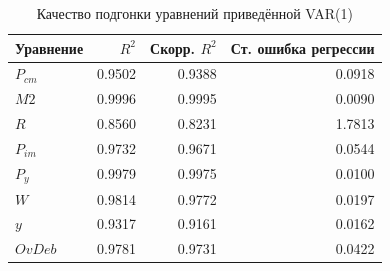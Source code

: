 \begin{table}[H]
\centering
\small

\begin{tabular}{l|r|r|r}
\hline
Уравнение & $R^2$ & Скорр. $R^2$ & Ст. ошибка регрессии\\
\hline
$P_{cm}$ & 0.9502 & 0.9388 & 0.0918\\
\hline
$M2$ & 0.9996 & 0.9995 & 0.0090\\
\hline
$R$ & 0.8560 & 0.8231 & 1.7813\\
\hline
$P_{im}$ & 0.9732 & 0.9671 & 0.0544\\
\hline
$P_y$ & 0.9979 & 0.9975 & 0.0100\\
\hline
$W$ & 0.9814 & 0.9772 & 0.0197\\
\hline
$y$ & 0.9317 & 0.9161 & 0.0162\\
\hline
$OvDeb$ & 0.9781 & 0.9731 & 0.0422\\
\hline
\end{tabular}
\caption{Качество подгонки уравнений приведённой VAR(1)}
\label{tab:var_equation_fit_const}
\end{table}
